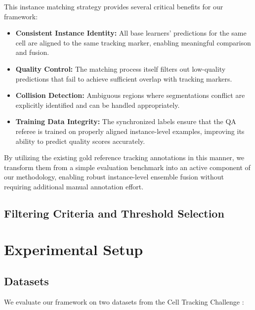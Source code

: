 This instance matching strategy provides several critical benefits for our framework:
\begin{itemize}
    \item \textbf{Consistent Instance Identity:} All base learners' predictions for the same cell are aligned to the same tracking marker, enabling meaningful comparison and fusion.
    \item \textbf{Quality Control:} The matching process itself filters out low-quality predictions that fail to achieve sufficient overlap with tracking markers.
    \item \textbf{Collision Detection:} Ambiguous regions where segmentations conflict are explicitly identified and can be handled appropriately.
    \item \textbf{Training Data Integrity:} The synchronized labels ensure that the QA referee is trained on properly aligned instance-level examples, improving its ability to predict quality scores accurately.
\end{itemize}

By utilizing the existing gold reference tracking annotations in this manner, we transform them
from a simple evaluation benchmark into an active component of our methodology, enabling robust
instance-level ensemble fusion without requiring additional manual annotation effort.

\subsection{Filtering Criteria and Threshold Selection}
\label{sec:filtering_criteria}



\section{Experimental Setup} %
\label{sec:experimental_setup}

\subsection{Datasets}
\label{sec:dataset}

We evaluate our framework on two datasets from the Cell Tracking Challenge \cite{maska2023cell}:

